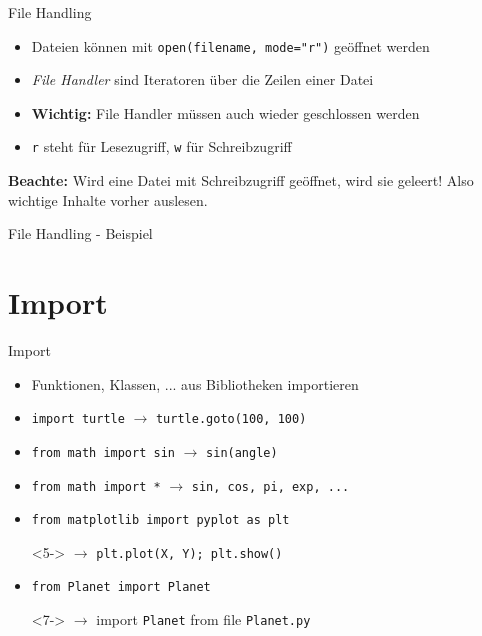 \begin{frame}{File Handling}
	\begin{itemize}
		\item Dateien können mit \alert{\texttt{open(filename, mode="r")}} geöffnet werden
		\item \textit{File Handler} sind Iteratoren über die Zeilen einer Datei
		\item \textbf{Wichtig:} File Handler müssen auch wieder geschlossen werden
		\item \texttt{r} steht für Lesezugriff,  \texttt{w} für Schreibzugriff
	\end{itemize}
	\textbf{Beachte:} Wird eine Datei mit Schreibzugriff geöffnet, wird sie geleert! Also wichtige Inhalte vorher auslesen.
\end{frame}

\begin{frame}{File Handling - Beispiel}
	
\end{frame}


\section{Import}

\begin{frame}{Import}
	\begin{itemize}
		\item<1-> Funktionen, Klassen, ... aus Bibliotheken importieren
		\item<1-> {\tt import turtle} $\to$ {\tt turtle.goto(100, 100)}
		\item<2-> {\tt from math import sin} $\to$ {\tt sin(angle)}
		\item<3-> {\tt from math import *} $\to$ {\tt sin, cos, pi, exp, ...}
		\item<4-> {\tt from matplotlib import pyplot as plt}
		\item[]<5-> $\to$ {\tt plt.plot(X, Y); plt.show()}
		\item<6-> {\tt from Planet import Planet}
		\item[]<7-> $\to$ import {\tt Planet} from file {\tt Planet.py}
	\end{itemize}
\end{frame}



